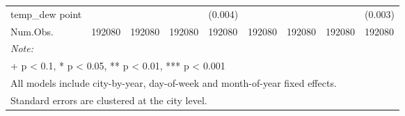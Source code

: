 \begin{landscape}
\begin{table}
{\begin{tabular}[t]{lllllllll}
\multirow{-2}{*}{\raggedright\arraybackslash temp_{dew point}} &  &  &  & (0.004) &  &  &  & (0.003)\\

Num.Obs. & 192080 & 192080 & 192080 & 192080 & 192080 & 192080 & 192080 & 192080\\
\bottomrule
\multicolumn{9}{l}{\rule{0pt}{1em}\textit{Note: }}\\
\multicolumn{9}{l}{\rule{0pt}{1em}+ p < 0.1, * p < 0.05, ** p < 0.01, *** p < 0.001}\\
\multicolumn{9}{l}{\rule{0pt}{1em}All models include city-by-year, day-of-week and month-of-year fixed effects.}\\
\multicolumn{9}{l}{\rule{0pt}{1em}Standard errors are clustered at the city level.}\\
\end{tabular}}
\end{table}
\end{landscape}
